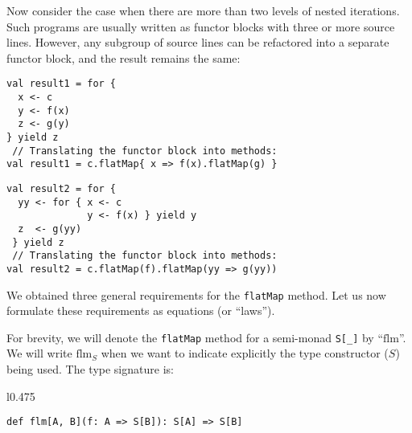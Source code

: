 Now consider the case when there are more than two levels of nested
iterations. Such programs are usually written as functor blocks with
three or more source lines. However, any subgroup of source lines
can be refactored into a separate functor block, and the result remains
the same:

\vspace{0.3\baselineskip}

\noindent \texttt{\textcolor{blue}{\footnotesize{}}}%
\begin{minipage}[c]{0.475\columnwidth}%
\begin{lstlisting}
val result1 = for {
  x <- c
  y <- f(x)
  z <- g(y)
} yield z
 // Translating the functor block into methods:
val result1 = c.flatMap{ x => f(x).flatMap(g) }
\end{lstlisting}
%
\end{minipage}\texttt{\textcolor{blue}{\footnotesize{}\hspace*{\fill}}}%
\begin{minipage}[c]{0.475\columnwidth}%
\begin{lstlisting}
val result2 = for {
  yy <- for { x <- c
              y <- f(x) } yield y
  z  <- g(yy)
 } yield z
 // Translating the functor block into methods:
val result2 = c.flatMap(f).flatMap(yy => g(yy))
\end{lstlisting}
%
\end{minipage}\vspace{0\baselineskip}

We obtained three general requirements for the \lstinline!flatMap!
method. Let us now formulate these requirements as equations (or \textsf{``}laws\textsf{''}).

For brevity, we will denote the \lstinline!flatMap! method for a
semi-monad \lstinline!S[_]! by \textsf{``}$\text{flm}$\textsf{''}. We will write
$\text{flm}_{S}$ when we want to indicate explicitly the type constructor
($S$) being used. The type signature is:

\begin{wrapfigure}{l}{0.475\columnwidth}%
\vspace{-0.9\baselineskip}

\begin{lstlisting}
def flm[A, B](f: A => S[B]): S[A] => S[B] 
\end{lstlisting}

\vspace{-0.5\baselineskip}
\end{wrapfigure}%

